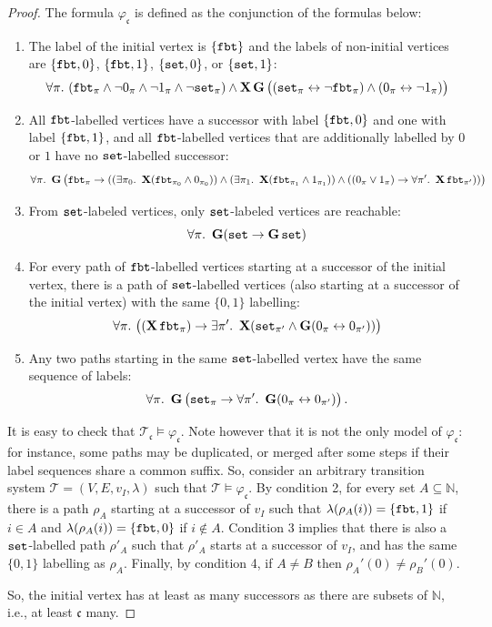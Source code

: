 \documentclass[dvipsnames,10pt,a4paper]{amsart}
\theoremstyle{definition}
\theoremstyle{remark}
\newcommand{\set}[1]{\{#1\}}
\newcommand{\nats}{\mathbb{N}}
\newcommand\Nat{\nats}
\newcommand{\cont}{\mathfrak{c}}
\newcommand{\tsys}{\mathcal{T}}
\newcommand{\initmark}{I}
\newcommand{\G}{\mathop{\mathbf{G}\vphantom{a}}\nolimits}
\newcommand{\X}{\mathop{\mathbf{X}\vphantom{a}}\nolimits}
\newcommand\fbt{\textup{\texttt{fbt}}}
\newcommand\pset{\textup{\texttt{set}}}
\newcommand\phiset{\varphi_{\cont}}
\newcommand\Kset{\tsys_{\cont}}
\begin{document}
\begin{proof}
  The formula $\phiset$ is defined as the conjunction of the formulas below:
  \begin{enumerate}
  \item The label of the initial vertex is $\{\fbt\}$ and the labels of non-initial vertices are $\set{\fbt, 0}$, $\set{\fbt, 1}$, $\set{\pset, 0}$, or $\set{\pset, 1}$:
    \[
      \forall \pi.\ ( \fbt_\pi \land \lnot 0_\pi \land \lnot 1_\pi \land
      \lnot \pset_\pi )\wedge \X \G \big(
      (\pset_\pi \leftrightarrow \lnot \fbt_\pi) \land 
      (0_\pi \leftrightarrow \lnot 1_\pi)      \big)
    \]

  \item All $\fbt$-labelled vertices have a successor with label $\{\fbt,0\}$
    and one with label $\{\fbt,1\}$, and all $\fbt$-labelled vertices that are additionally labelled by $0$ or $1$ have no $\pset$-labelled successor:
    \[
      \forall \pi.\ \G\big(\fbt_\pi \rightarrow (
      (\exists \pi_0.\ \X (\fbt_{\pi_0} \land 0_{\pi_0}))
      \land (\exists \pi_1.\ \X (\fbt_{\pi_1} \land  1_{\pi_1})) \land
      ( (0_\pi \vee 1_{\pi}) \rightarrow \forall \pi'.\ \X \fbt_{\pi'}))
      \big)
    \]
   \item From $\pset$-labeled vertices, only $\pset$-labeled vertices are reachable:  
   \[\forall \pi.\ \G (\pset \rightarrow \G \pset) \] 
    
  \item For every path of $\fbt$-labelled vertices starting at a successor
    of the initial vertex, there is a path of $\pset$-labelled vertices
    (also starting at a successor of the initial vertex) with the same
    $\{0,1\}$ labelling:
    \[
      \forall \pi.\  \big( (\X \fbt_\pi) \rightarrow
      \exists \pi'.\ \X( \pset_{\pi'} \land \G(0_\pi \leftrightarrow 0_{\pi'}))
      \big)
    \]
  \item Any two paths starting in the same $\pset$-labelled vertex have the same sequence of labels:
    \[
      \forall \pi.\ \G \big(\pset_\pi \rightarrow
      \forall \pi'.\ \G(0_\pi \leftrightarrow 0_{\pi'})
      \big) \, .
    \]
  \end{enumerate}

  It is easy to check that $\Kset \models \phiset$.
  Note however that it is not the only model of $\phiset$: for instance,
  some paths may be duplicated, or merged after some steps if their label
  sequences share a common suffix.
  So, consider an arbitrary transition system $\tsys = (V,E,v_\initmark, \lambda)$
  such that $\tsys \models \phiset$.
  By condition 2, for every set $A \subseteq \Nat$,  there is a path
  $\rho_A$ starting at a successor of $v_\initmark$
  such that $\lambda(\rho_A(i)) = \{\fbt,1\}$ if $i \in A$ and
  $\lambda(\rho_A(i)) = \{\fbt,0\}$ if $i \notin A$.
  Condition 3 implies that there is also a $\pset$-labelled path $\rho'_A$
  such that $\rho'_A$ starts at a successor of $v_\initmark$, and has the same
  $\{0,1\}$ labelling as $\rho_A$.
  Finally, by condition 4, if $A \neq B$ then $\rho_A'(0) \neq \rho_{B}'(0)$.
  
  So, the initial vertex has at least as many successors as there are subsets of $\nats$, i.e., at least $\cont$ many.
\end{proof}
\end{document}
